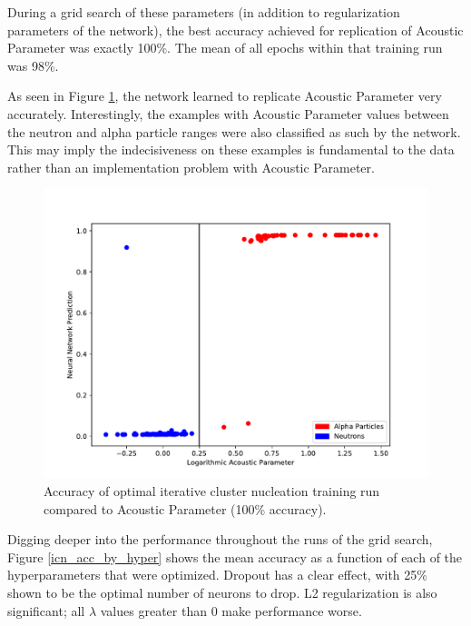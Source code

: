 \documentclass[10pt]{article}
\begin{document}
During a grid search of these parameters (in addition to regularization parameters of the network), the best accuracy achieved for replication of Acoustic Parameter was exactly 100\%. The mean of all epochs within that training run was 98\%.

As seen in Figure \ref{icn_grid_search}, the network learned to replicate Acoustic Parameter very accurately. Interestingly, the examples with Acoustic Parameter values between the neutron and alpha particle ranges were also classified as such by the network. This may imply the indecisiveness on these examples is fundamental to the data rather than an implementation problem with Acoustic Parameter.

\begin{figure}[h]
    \centering
    \includegraphics[width=\textwidth]{icn_grid_search}
    \caption{\label{icn_grid_search} Accuracy of optimal iterative cluster nucleation training run compared to Acoustic Parameter (100\% accuracy).}
\end{figure}

Digging deeper into the performance throughout the runs of the grid search, Figure \ref{icn_acc_by_hyper} shows the mean accuracy as a function of each of the hyperparameters that were optimized. Dropout has a clear effect, with 25\% shown to be the optimal number of neurons to drop. L2 regularization is also significant; all $\lambda$ values greater than 0 make performance worse.
\end{document}
